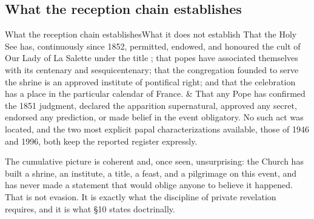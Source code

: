 \subsection{What the reception chain establishes}

\begin{boundarytable}{What the reception chain establishes}{What it
does not establish}
That the Holy See has, continuously since 1852, permitted, endowed,
and honoured the cult of Our Lady of La Salette under the title
; that popes have associated themselves with
its centenary and sesquicentenary; that the congregation founded to
serve the shrine is an approved institute of pontifical right; and
that the celebration has a place in the particular calendar of
France. & That any Pope has confirmed the 1851 judgment, declared
the apparition supernatural, approved any secret, endorsed any
prediction, or made belief in the event obligatory. No such act was
located, and the two most explicit papal characterizations
available, those of 1946 and 1996, both keep the reported register
expressly. \\
\end{boundarytable}

The cumulative picture is coherent and, once seen, unsurprising: the
Church has built a shrine, an institute, a title, a feast, and a
pilgrimage on this event, and has never made a statement that would
oblige anyone to believe it happened. That is not evasion. It is
exactly what the discipline of private revelation requires, and it
is what \S10 states doctrinally.
